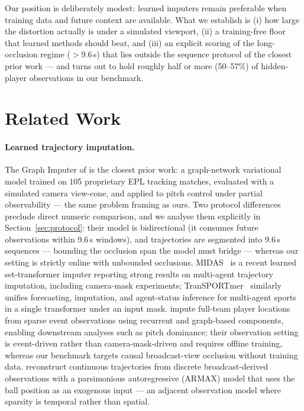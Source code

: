 \documentclass[11pt]{article}
\begin{document}
Our position is deliberately modest: learned imputers remain preferable when
training data and future context are available. What we establish is (i) how
large the distortion actually is under a simulated viewport, (ii) a
training-free floor that learned methods should beat, and (iii) an explicit
scoring of the long-occlusion regime ($>$9.6\,s) that lies outside the
sequence protocol of the closest prior work --- and turns out to hold roughly
half or more (50--57\%) of hidden-player observations in our benchmark.

\section{Related Work}
\label{sec:related}

\paragraph{Learned trajectory imputation.}
The Graph Imputer of \citet{omidshafiei2022} is the closest prior work: a
graph-network variational model trained on 105 proprietary EPL tracking matches,
evaluated with a simulated camera view-cone, and applied to pitch control under
partial observability --- the same problem framing as ours. Two protocol
differences preclude direct numeric comparison, and we analyse them explicitly in
Section~\ref{sec:protocol}: their model is bidirectional (it consumes future
observations within 9.6\,s windows), and trajectories are segmented into
9.6\,s sequences --- bounding the occlusion span the model must bridge ---
whereas our setting is strictly online with unbounded occlusions.
MIDAS~\citep{choi2025midas} is a recent learned set-transformer imputer
reporting strong results on multi-agent trajectory imputation, including
camera-mask experiments; TranSPORTmer~\citep{capellera2024transportmer} similarly
unifies forecasting, imputation, and agent-status inference for multi-agent
sports in a single transformer under an input mask. \citet{everett2023inferring}
impute full-team player locations from sparse event observations using recurrent
and graph-based components, enabling downstream analyses such as pitch dominance;
their observation setting is event-driven rather than camera-mask-driven and
requires offline training, whereas our benchmark targets causal broadcast-view
occlusion without training data. \citet{penn2025continuous} reconstruct continuous
trajectories from discrete broadcast-derived observations with a parsimonious
autoregressive (ARMAX) model that uses the ball position as an exogenous
input --- an adjacent observation model where sparsity is temporal rather than
spatial.
\end{document}
